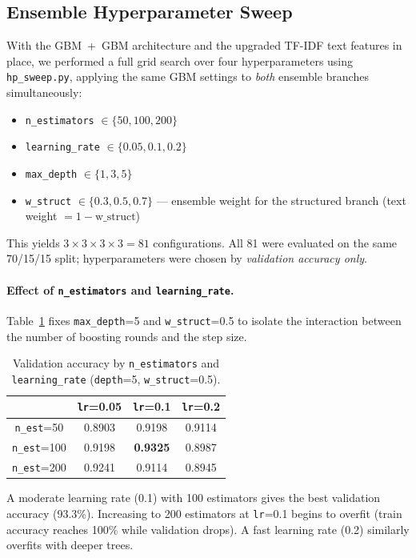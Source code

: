 \documentclass[11pt,letterpaper]{article}
\begin{document}
\subsection{Ensemble Hyperparameter Sweep}

With the GBM~+~GBM architecture and the upgraded TF-IDF text features in place,
we performed a full grid search over four hyperparameters using
\texttt{hp\_sweep.py}, applying the same GBM settings to \emph{both} ensemble
branches simultaneously:
\begin{itemize}
  \item \texttt{n\_estimators} $\in \{50, 100, 200\}$
  \item \texttt{learning\_rate} $\in \{0.05, 0.1, 0.2\}$
  \item \texttt{max\_depth} $\in \{1, 3, 5\}$
  \item \texttt{w\_struct} $\in \{0.3, 0.5, 0.7\}$ — ensemble weight for the
        structured branch (text weight $= 1 - \text{w\_struct}$)
\end{itemize}
This yields $3 \times 3 \times 3 \times 3 = 81$ configurations.
All 81 were evaluated on the same 70/15/15 split; hyperparameters were chosen
by \emph{validation accuracy only}.

\paragraph{Effect of \texttt{n\_estimators} and \texttt{learning\_rate}.}
Table~\ref{tab:nest-lr} fixes \texttt{max\_depth}=5 and \texttt{w\_struct}=0.5
to isolate the interaction between the number of boosting rounds and the step size.

\begin{table}[H]
\centering
\caption{Validation accuracy by \texttt{n\_estimators} and \texttt{learning\_rate}
(\texttt{depth}=5, \texttt{w\_struct}=0.5).}
\label{tab:nest-lr}
\begin{tabular}{cccc}
\toprule
 & \texttt{lr}=0.05 & \texttt{lr}=0.1 & \texttt{lr}=0.2 \\
\midrule
\texttt{n\_est}=50  & 0.8903 & 0.9198 & 0.9114 \\
\texttt{n\_est}=100 & 0.9198 & \textbf{0.9325} & 0.8987 \\
\texttt{n\_est}=200 & 0.9241 & 0.9114 & 0.8945 \\
\bottomrule
\end{tabular}
\end{table}

\noindent A moderate learning rate (0.1) with 100 estimators gives the best
validation accuracy (93.3\%).  Increasing to 200 estimators at \texttt{lr}=0.1
begins to overfit (train accuracy reaches 100\% while validation drops).
A fast learning rate (0.2) similarly overfits with deeper trees.
\end{document}
